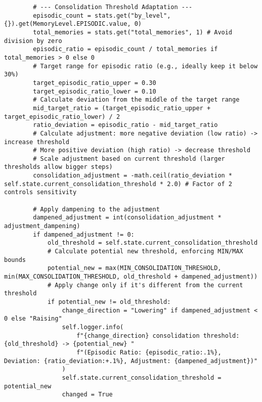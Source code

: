 \documentclass[12pt,a4paper]{article}
\begin{document}
\begin{pageablecode}
\begin{verbatim}
        # --- Consolidation Threshold Adaptation ---
        episodic_count = stats.get("by_level", {}).get(MemoryLevel.EPISODIC.value, 0)
        total_memories = stats.get("total_memories", 1) # Avoid division by zero
        episodic_ratio = episodic_count / total_memories if total_memories > 0 else 0
        # Target range for episodic ratio (e.g., ideally keep it below 30%)
        target_episodic_ratio_upper = 0.30
        target_episodic_ratio_lower = 0.10
        # Calculate deviation from the middle of the target range
        mid_target_ratio = (target_episodic_ratio_upper + target_episodic_ratio_lower) / 2
        ratio_deviation = episodic_ratio - mid_target_ratio
        # Calculate adjustment: more negative deviation (low ratio) -> increase threshold
        # More positive deviation (high ratio) -> decrease threshold
        # Scale adjustment based on current threshold (larger thresholds allow bigger steps)
        consolidation_adjustment = -math.ceil(ratio_deviation * self.state.current_consolidation_threshold * 2.0) # Factor of 2 controls sensitivity

        # Apply dampening to the adjustment
        dampened_adjustment = int(consolidation_adjustment * adjustment_dampening)
        if dampened_adjustment != 0:
            old_threshold = self.state.current_consolidation_threshold
            # Calculate potential new threshold, enforcing MIN/MAX bounds
            potential_new = max(MIN_CONSOLIDATION_THRESHOLD, min(MAX_CONSOLIDATION_THRESHOLD, old_threshold + dampened_adjustment))
            # Apply change only if it's different from the current threshold
            if potential_new != old_threshold:
                change_direction = "Lowering" if dampened_adjustment < 0 else "Raising"
                self.logger.info(
                    f"{change_direction} consolidation threshold: {old_threshold} -> {potential_new} "
                    f"(Episodic Ratio: {episodic_ratio:.1%}, Deviation: {ratio_deviation:+.1%}, Adjustment: {dampened_adjustment})"
                )
                self.state.current_consolidation_threshold = potential_new
                changed = True


\end{verbatim}
\end{pageablecode}
\end{document}
